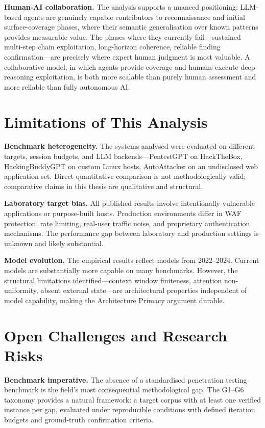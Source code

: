 \documentclass[12pt,a4paper,oneside,openany]{book}
\begin{document}
\textbf{Human-AI collaboration.} The analysis supports a nuanced positioning: LLM-based agents are genuinely capable contributors to reconnaissance and initial surface-coverage phases, where their semantic generalisation over known patterns provides measurable value. The phases where they currently fail---sustained multi-step chain exploitation, long-horizon coherence, reliable finding confirmation---are precisely where expert human judgment is most valuable. A collaborative model, in which agents provide coverage and humans execute deep-reasoning exploitation, is both more scalable than purely human assessment and more reliable than fully autonomous AI.

\section{Limitations of This Analysis}

\textbf{Benchmark heterogeneity.} The systems analysed were evaluated on different targets, session budgets, and LLM backends---PentestGPT on HackTheBox, HackingBuddyGPT on custom Linux hosts, AutoAttacker on an undisclosed web application set. Direct quantitative comparison is not methodologically valid; comparative claims in this thesis are qualitative and structural.

\textbf{Laboratory target bias.} All published results involve intentionally vulnerable applications or purpose-built hosts. Production environments differ in WAF protection, rate limiting, real-user traffic noise, and proprietary authentication mechanisms. The performance gap between laboratory and production settings is unknown and likely substantial.

\textbf{Model evolution.} The empirical results reflect models from 2022--2024. Current models are substantially more capable on many benchmarks. However, the structural limitations identified---context window finiteness, attention non-uniformity, absent external state---are architectural properties independent of model capability, making the Architecture Primacy argument durable.

\section{Open Challenges and Research Risks}

\textbf{Benchmark imperative.} The absence of a standardised penetration testing benchmark is the field's most consequential methodological gap. The G1--G6 taxonomy provides a natural framework: a target corpus with at least one verified instance per gap, evaluated under reproducible conditions with defined iteration budgets and ground-truth confirmation criteria.
\end{document}
